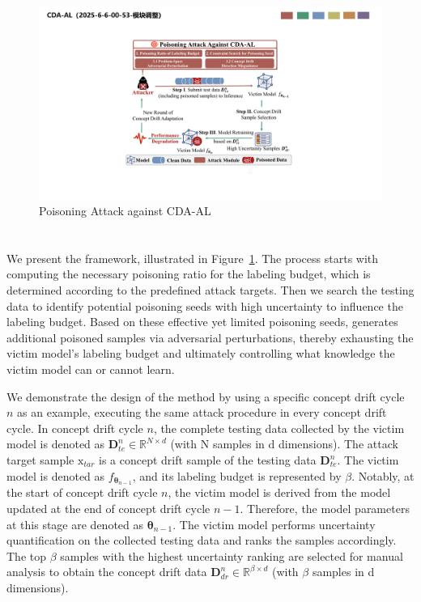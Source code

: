 \begin{figure}[t]
	\centering
	\includegraphics[width=\linewidth,keepaspectratio]{Graph/Attack_Method/PACDA_attack_process_2025_6_6_01_07.pdf}
	\caption{Poisoning Attack against CDA-AL}
	\label{fig:Attack Process}
\end{figure}

\section{\pandora}
\label{Sec: Attack Method}

We present the \pandora framework, illustrated in Figure~\ref{fig:Attack Process}.
The process starts with computing the necessary poisoning ratio for the labeling budget, which is determined according to the predefined attack targets.
Then we search the testing data to identify potential poisoning seeds with high uncertainty to influence the labeling budget.
Based on these effective yet limited poisoning seeds, \pandora generates additional poisoned samples via adversarial perturbations, thereby exhausting the victim model’s labeling budget and ultimately controlling what knowledge the victim model can or cannot learn.

We demonstrate the design of the \pandora method by using a specific concept drift cycle $n$ as an example, executing the same attack procedure in every concept drift cycle.
In concept drift cycle $n$, the complete testing data collected by the victim model is denoted as $\bm{D}_{te}^{n} \in \mathbb{R}^{N \times d}$ (with N samples in d dimensions).
The attack target sample $\bm{\mathrm{x}}_{tar}$ is a concept drift sample of the testing data $\bm{D}_{te}^{n}$. 
The victim model is denoted as $f_{\bm{\theta}_{n-1}}$, and its labeling budget is represented by $\beta$.
Notably, at the start of concept drift cycle $n$, the victim model is derived from the model updated at the end of concept drift cycle $n-1$.
Therefore, the model parameters at this stage are denoted as $\bm{\theta}_{n-1}$.
The victim model performs uncertainty quantification on the collected testing data and ranks the samples accordingly.
The top $\beta$ samples with the highest uncertainty ranking are selected for manual analysis to obtain the concept drift data $\bm{D}_{dr}^{n} \in \mathbb{R}^{\beta \times d}$ (with $\beta$ samples in d dimensions).

